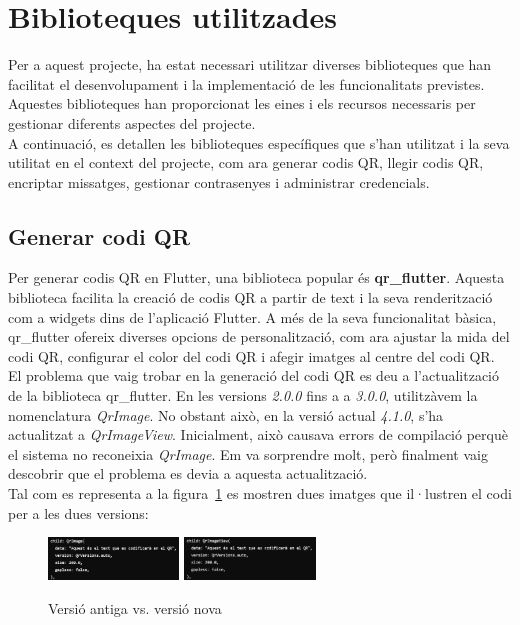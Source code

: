 \documentclass[a4paper,12pt,twoside]{ThesisStyle}
\begin{document}
\section{Biblioteques utilitzades}
\label{sec: Biblioteques utilitzades}


Per a aquest projecte, ha estat necessari utilitzar diverses biblioteques que han facilitat el desenvolupament i la implementació de les funcionalitats previstes. Aquestes biblioteques han proporcionat les eines i els recursos necessaris per gestionar diferents aspectes del projecte.\\

A continuació, es detallen les biblioteques específiques que s'han utilitzat i la seva utilitat en el context del projecte, com ara generar codis QR, llegir codis QR, encriptar missatges, gestionar contrasenyes i administrar credencials.




\subsection{Generar codi QR}
\label{subsec: Generar codi QR}

Per generar codis QR en Flutter, una biblioteca popular és \textbf{qr\_flutter}. Aquesta biblioteca facilita la creació de codis QR a partir de text i la seva renderització com a widgets dins de l'aplicació Flutter. A més de la seva funcionalitat bàsica, qr\_flutter ofereix diverses opcions de personalització, com ara ajustar la mida del codi QR, configurar el color del codi QR i afegir imatges al centre del codi QR.\\

El problema que vaig trobar en la generació del codi QR es deu a l'actualització de la biblioteca qr\_flutter. En les versions \textit{2.0.0} fins a a \textit{3.0.0}, utilitzàvem la nomenclatura \textit{QrImage}. No obstant això, en la versió actual \textit{4.1.0}, s'ha actualitzat a \textit{QrImageView}. Inicialment, això causava errors de compilació perquè el sistema no reconeixia \textit{QrImage}. Em va sorprendre molt, però finalment vaig descobrir que el problema es devia a aquesta actualització.\\ 

Tal com es representa a la figura~\ref{fig:Versió antiga vs. versió nova}  es mostren dues imatges que il·lustren el codi per a les dues versions:

\begin{figure}[h]
    \centering
    \includegraphics[width=0.31\textwidth]{imatges/qrold.png}
    \includegraphics[width=0.31\textwidth]{imatges/qrnew.png}
    \caption{Versió antiga vs. versió nova}
    \label{fig:Versió antiga vs. versió nova}
\end{figure}
\end{document}
